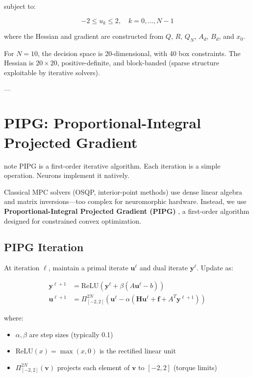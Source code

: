 subject to:

\[
-2 \le u_k \le 2, \quad k = 0, \ldots, N-1
\]

where the Hessian and gradient are constructed from $Q$, $R$, $Q_N$, $A_d$, $B_d$, and $x_0$.

For $N = 10$, the decision space is 20-dimensional, with 40 box constraints. The Hessian is $20 \times 20$, positive-definite, and block-banded (sparse structure exploitable by iterative solvers).

---

\section{PIPG: Proportional-Integral Projected Gradient}
\begin{block}{note}
PIPG is a first-order iterative algorithm. Each iteration is a simple operation. Neurons implement it natively.
\end{block}

\label{sec:pipg}

Classical MPC solvers (OSQP, interior-point methods) use dense linear algebra and matrix inversions—too complex for neuromorphic hardware. Instead, we use \textbf{Proportional-Integral Projected Gradient (PIPG)} \cite{He2016}, a first-order algorithm designed for constrained convex optimization.

\subsection{PIPG Iteration}

At iteration $\ell$, maintain a primal iterate $\mathbf{u}^\ell$ and dual iterate $\mathbf{y}^\ell$. Update as:

\[
\begin{aligned}
\mathbf{y}^{\ell+1} &= \text{ReLU}\left( \mathbf{y}^\ell + \beta (A \mathbf{u}^\ell - b) \right) \\
\mathbf{u}^{\ell+1} &= \Pi_{[-2,2]}^{2N} \left( \mathbf{u}^\ell - \alpha (\mathbf{H} \mathbf{u}^\ell + \mathbf{f} + A^T \mathbf{y}^{\ell+1}) \right)
\end{aligned}
\]

where:
\begin{itemize}
\item $\alpha, \beta$ are step sizes (typically 0.1)
\item $\text{ReLU}(x) = \max(x, 0)$ is the rectified linear unit
\item $\Pi_{[-2,2]}^{2N}(\mathbf{v})$ projects each element of $\mathbf{v}$ to $[-2, 2]$ (torque limits)
\end{itemize}

